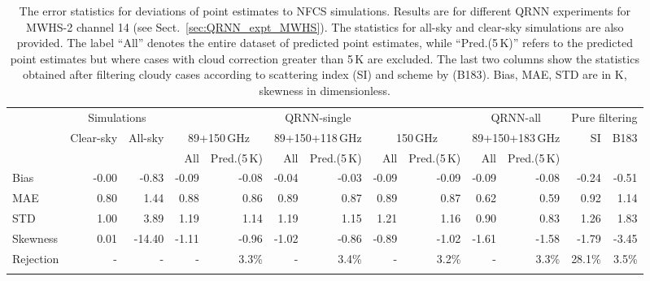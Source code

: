 \documentclass[amt, manuscript]{copernicus}
\begin{document}
\begin{table}[t]
	\caption{The error statistics for deviations of point estimates to NFCS simulations. Results are for different QRNN experiments for MWHS-2 channel 14 (see Sect.~\ref{sec:QRNN_expt_MWHS}). The statistics for all-sky and clear-sky simulations are also provided. The label ``All'' denotes the entire dataset of predicted point estimates, while ``Pred.(5\,K)'' refers to the predicted point estimates but where cases with cloud correction greater than 5\,K are excluded. The last two columns show the statistics obtained after filtering cloudy cases according to scattering index (SI) and scheme by \citet{buehler:aclou:07} (B183). Bias, MAE, STD are in K, skewness in dimensionless.}
	\label{tab:error_statistics_mwhs_14}
	\setlength{\tabcolsep}{4pt}
	\begin{tabular}{lrr|rr|rr|rr|rr|rr}
		\tophline
		&\multicolumn{2}{c|}{Simulations}& \multicolumn{6}{c|}{QRNN-single} & \multicolumn{2}{c|}{QRNN-all} & \multicolumn{2}{c}{Pure filtering}\\
		\cline{2-13}
		&   Clear-sky &   All-sky &  \multicolumn{2}{c|}{89+150\,GHz} & \multicolumn{2}{c|}{89+150+118\,GHz} & \multicolumn{2}{c|}{150\,GHz} & \multicolumn{2}{c|}{89+150+183\,GHz}& SI & B183\\		
		&			   &			& All & Pred.(5\,K) & All & Pred.(5\,K) & All & Pred.(5\,K)  & All & Pred.(5\,K)&&\\
		\middlehline
Bias     & -0.00 &  -0.83 & -0.09 & -0.08 & -0.04 & -0.03 & -0.09 & -0.09 & -0.09 & -0.08 & -0.24 & -0.51\\
MAE      &  0.80 &   1.44 &  0.88 &  0.86 &  0.89 &  0.87 &  0.89 &  0.87 &  0.62 &  0.59 &  0.92 &  1.14\\
STD      &  1.00 &   3.89 &  1.19 &  1.14 &  1.19 &  1.15 &  1.21 &  1.16 &  0.90 &  0.83 &  1.26 &  1.83\\
Skewness &  0.01 & -14.40 & -1.11 & -0.96 & -1.02 & -0.86 & -0.89 & -1.02 & -1.61 & -1.58 & -1.79 & -3.45\\
Rejection&  -	 & - 	  & - 	  & 3.3\% & - 	  & 3.4\% & -     & 3.2\% & -     & 3.3\% & 28.1\%& 3.5\%\\
\bottomhline
	\end{tabular}
\end{table}
\end{document}
